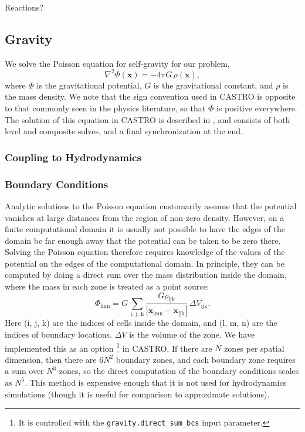 \documentclass[12pt,preprint]{aastex}
\begin{document}
Reactions?

\subsection{Gravity}
\label{sec:gravity}

We solve the Poisson equation for self-gravity for our problem,
\begin{equation}
  \nabla^2 \Phi(\mathbf{x}) = -4\pi G\, \rho(\mathbf{x}),
\end{equation}
where $\Phi$ is the gravitational potential, $G$ is the gravitational constant, and $\rho$ is the mass density. We note that the sign convention used in CASTRO is opposite to that commonly seen in the physics literature, so that $\Phi$ is positive everywhere. The solution of this equation in CASTRO is described in \cite{castro}, and consists of both level and composite solves, and a final synchronization at the end.

\subsubsection{Coupling to Hydrodynamics}\label{sec:gravity_hydro_coupling}

\subsubsection{Boundary Conditions}\label{sec:gravity_boundary_conditions}

Analytic solutions to the Poisson equation customarily assume that the potential vanishes at large distances from the region of non-zero density. However, on a finite computational domain it is usually not possible to have the edges of the domain be far enough away that the potential can be taken to be zero there. Solving the Poisson equation therefore requires knowledge of the values of the potential on the edges of the computational domain. In principle, they can be computed by doing a direct sum over the mass distribution inside the domain, where the mass in each zone is treated as a point source:
\begin{equation}
  \Phi_{\text{lmn}} = G\, \sum_{\text{i, j, k}} \frac{G \rho_{\text{ijk}}}{|\mathbf{x}_{\text{lmn}} - \mathbf{x}_{\text{ijk}}|}\, \Delta V_{\text{ijk}}.\label{direct_sum}
\end{equation}
Here (i, j, k) are the indices of cells inside the domain, and (l, m, n) are the indices of boundary locations. $\Delta V$ is the volume of the zone. We have implemented this as an option \footnote{It is controlled with the \texttt{gravity.direct\_sum\_bcs} input parameter.} in CASTRO. If there are $N$ zones per spatial dimension, then there are $6 N^2$ boundary zones, and each boundary zone requires a sum over $N^3$ zones, so the direct computation of the boundary conditions scales as $N^5$.  This method is expensive enough that it is not used for hydrodynamics simulations (though it is useful for comparison to approximate solutions).
\end{document}
